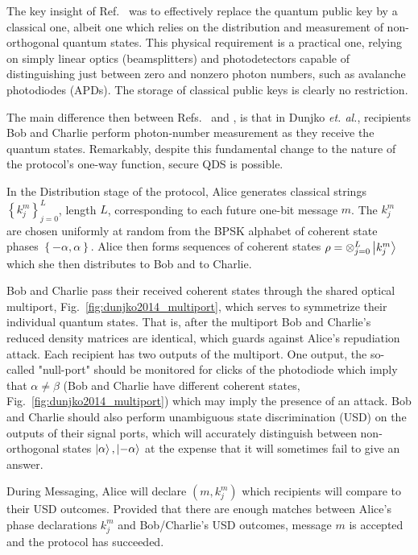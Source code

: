 The key insight of Ref.~\cite{Dunjko2014} was to effectively replace the quantum public key by a classical one, albeit one which relies on the distribution and measurement of non-orthogonal quantum states. This physical requirement is a practical one, relying on simply linear optics (beamsplitters) and photodetectors capable of distinguishing just between zero and nonzero photon numbers, such as avalanche photodiodes (APDs). The storage of classical public keys is clearly no restriction. 

The main difference then between Refs.~\cite{Dunjko2014} and \cite{Gottesman2001}, is that in Dunjko \emph{et. al.}, recipients Bob and Charlie perform photon-number measurement as they receive the quantum states. Remarkably, despite this fundamental change to the nature of the protocol's one-way function, secure QDS is possible. 


In the Distribution stage of the protocol, Alice generates classical strings $\left\{k_j^m\right\}_{j=0}^L$, length $L$, corresponding to each future one-bit message $m$. The $k_j^m$ are chosen uniformly at random from the BPSK alphabet of coherent state phases $\left\{- \alpha, \alpha\right\}$. Alice then forms sequences of coherent states $\rho = \otimes_{j=0}^L \ket{k_j^m}$ which she then distributes to Bob and to Charlie. 



Bob and Charlie pass their received coherent states through the shared optical multiport, Fig.~\ref{fig:dunjko2014_multiport}, which serves to symmetrize their individual quantum states. That is, after the multiport Bob and Charlie's reduced density matrices are identical, which guards against Alice's repudiation attack. Each recipient has two outputs of the multiport. One output, the so-called "null-port" should be monitored for clicks of the photodiode which imply that $\alpha \ne \beta$ (Bob and Charlie have different coherent states, Fig.~\ref{fig:dunjko2014_multiport}) which may imply the presence of an attack. Bob and Charlie should also perform unambiguous state discrimination (USD) on the outputs of their signal ports, which will accurately distinguish between non-orthogonal states $\ket{\alpha}, \ket{-\alpha}$ at the expense that it will sometimes fail to give an answer. 

During Messaging, Alice will declare $\left(m, k_j^m\right)$ which recipients will compare to their USD outcomes. Provided that there are enough matches between Alice's phase declarations $k_j^m$ and Bob/Charlie's USD outcomes, message $m$ is accepted and the protocol has succeeded.

